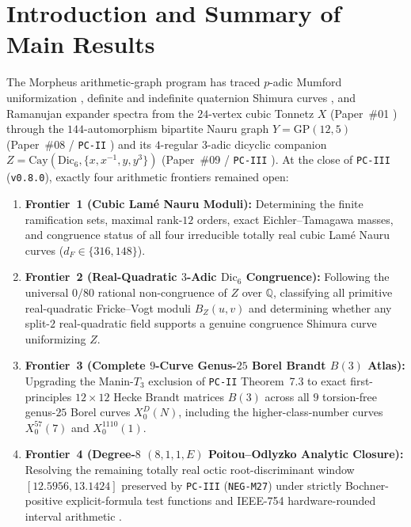 \documentclass[11pt]{amsart}
\numberwithin{equation}{section}
\theoremstyle{plain}
\theoremstyle{definition}\newtheorem{definition}[theorem]{Definition}
\theoremstyle{remark}\newtheorem{remark}[theorem]{Remark}
\newcommand{\Q}{\mathbb{Q}}
\newcommand{\Cay}{\mathrm{Cay}}
\newcommand{\GP}{\mathrm{GP}}
\newcommand{\Dic}{\mathrm{Dic}}
\begin{document}
\section{Introduction and Summary of Main Results}\label{sec:intro}
The Morpheus arithmetic-graph program has traced $p$-adic Mumford uniformization \cite{drinfeld1976,serre1980}, definite and indefinite quaternion Shimura curves \cite{eichler1955,shimura1967,vigneras1980,voight2021}, and Ramanujan expander spectra \cite{lps1988,pizer1980} from the $24$-vertex cubic Tonnetz $X$ (Paper~\#01 \cite{ergentics2026pc}) through the $144$-automorphism bipartite Nauru graph $Y = \GP(12,5)$ (Paper~\#08 / \texttt{PC-II} \cite{ergentics2026pc2}) and its $4$-regular $3$-adic dicyclic companion $Z = \Cay(\Dic_6, \{x, x^{-1}, y, y^3\})$ (Paper~\#09 / \texttt{PC-III} \cite{ergentics2026pc3}).
At the close of \texttt{PC-III} (\texttt{v0.8.0}), exactly four arithmetic frontiers remained open:
\begin{enumerate}[label=(\arabic*),nosep]
\item \textbf{Frontier~1 (Cubic Lam\'e Nauru Moduli):} Determining the finite ramification sets, maximal rank-$12$ orders, exact Eichler--Tamagawa masses, and congruence status of all four irreducible totally real cubic Lam\'e Nauru curves ($d_F \in \{316, 148\}$).
\item \textbf{Frontier~2 (Real-Quadratic $3$-Adic $\Dic_6$ Congruence):} Following the universal $0/80$ rational non-congruence of $Z$ over $\Q$, classifying all primitive real-quadratic Fricke--Vogt moduli $B_Z(u,v)$ and determining whether any split-$2$ real-quadratic field supports a genuine congruence Shimura curve uniformizing $Z$.
\item \textbf{Frontier~3 (Complete $9$-Curve Genus-$25$ Borel Brandt $B(3)$ Atlas):} Upgrading the Manin-$T_3$ exclusion of \texttt{PC-II} Theorem~7.3 to exact first-principles $12\times 12$ Hecke Brandt matrices $B(3)$ across all $9$ torsion-free genus-$25$ Borel curves $X_0^D(N)$, including the higher-class-number curves $X_0^{57}(7)$ and $X_0^{1110}(1)$.
\item \textbf{Frontier~4 (Degree-$8$ $(8,1,1,E)$ Poitou--Odlyzko Analytic Closure):} Resolving the remaining totally real octic root-discriminant window $[12.5956, 13.1424]$ preserved by \texttt{PC-III} (\texttt{NEG-M27}) under strictly Bochner-positive explicit-formula test functions \cite{poitou1977,odlyzko1990} and IEEE-754 hardware-rounded interval arithmetic \cite{moore1966}.
\end{enumerate}
\end{document}
